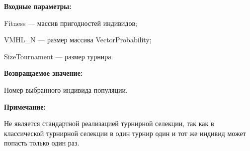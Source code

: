 \textbf{Входные параметры:}
 
Fitness --- массив пригодностей индивидов;
 
VMHL\_N --- размер массива VectorProbability;
 
SizeTournament --- размер турнира.

\textbf{Возвращаемое значение:} 

 Номер выбранного индивида популяции.

\textbf{Примечание:}

 Не является стандартной реализацией турнирной селекции, так как в классической турнирной селекции в один турнир один и тот же индивид может попасть только один раз.

